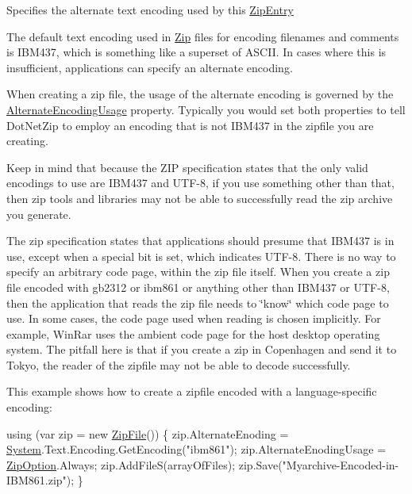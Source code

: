 Specifies the alternate text encoding used by this \mbox{\hyperlink{class_super_tiled2_unity_1_1_ionic_1_1_zip_1_1_zip_entry}{Zip\+Entry}} 

The default text encoding used in \mbox{\hyperlink{namespace_super_tiled2_unity_1_1_ionic_1_1_zip}{Zip}} files for encoding filenames and comments is I\+B\+M437, which is something like a superset of A\+S\+C\+II. In cases where this is insufficient, applications can specify an alternate encoding. 

When creating a zip file, the usage of the alternate encoding is governed by the \mbox{\hyperlink{class_super_tiled2_unity_1_1_ionic_1_1_zip_1_1_zip_entry_a972512ebe8d25c895ad0d67e75e24bfb}{Alternate\+Encoding\+Usage}} property. Typically you would set both properties to tell Dot\+Net\+Zip to employ an encoding that is not I\+B\+M437 in the zipfile you are creating. 

Keep in mind that because the Z\+IP specification states that the only valid encodings to use are I\+B\+M437 and U\+T\+F-\/8, if you use something other than that, then zip tools and libraries may not be able to successfully read the zip archive you generate. 

The zip specification states that applications should presume that I\+B\+M437 is in use, except when a special bit is set, which indicates U\+T\+F-\/8. There is no way to specify an arbitrary code page, within the zip file itself. When you create a zip file encoded with gb2312 or ibm861 or anything other than I\+B\+M437 or U\+T\+F-\/8, then the application that reads the zip file needs to \char`\"{}know\char`\"{} which code page to use. In some cases, the code page used when reading is chosen implicitly. For example, Win\+Rar uses the ambient code page for the host desktop operating system. The pitfall here is that if you create a zip in Copenhagen and send it to Tokyo, the reader of the zipfile may not be able to decode successfully. 

This example shows how to create a zipfile encoded with a language-\/specific encoding\+: 
\begin{DoxyCode}
\textcolor{keyword}{using} (var zip = \textcolor{keyword}{new} \mbox{\hyperlink{namespace_super_tiled2_unity_1_1_ionic_1_1_zip_a9ced5352c56e7e0fceff15b534073c83a088ad16b06174c69965e232063ba6d16}{ZipFile}}())
\{
   zip.AlternateEnoding = \mbox{\hyperlink{namespace_system}{System}}.Text.Encoding.GetEncoding(\textcolor{stringliteral}{"ibm861"});
   zip.AlternateEnodingUsage = \mbox{\hyperlink{namespace_super_tiled2_unity_1_1_ionic_1_1_zip_a25d431031427c142eba970006eee630c}{ZipOption}}.Always;
   zip.AddFileS(arrayOfFiles);
   zip.Save(\textcolor{stringliteral}{"Myarchive-Encoded-in-IBM861.zip"});
\}
\end{DoxyCode}
 

